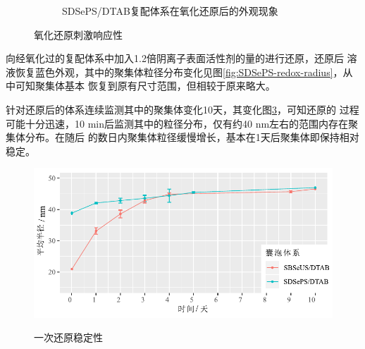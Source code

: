 \documentclass[bachelor,winfonts,replaceperiod]{jnuthesis}
\begin{document}
\begin{figure}[htbp]
\begin{subfigure}[]{.5\textwidth}
            \caption{SDSePS/DTAB复配体系在氧化还原后的外观现象}\label{fig:scheme-SDSePS-redox}
        \end{subfigure}%
        \caption{氧化还原刺激响应性}
        \label{fig:氧化还原刺激响应性}
    \end{figure}
    
    向经氧化过的复配体系中加入1.2倍阴离子表面活性剂的量的进行还原，还原后
    溶液恢复蓝色外观，其中的聚集体粒径分布变化见图\ref{fig:SDSePS-redox-radius}，从中可知聚集体基本
    恢复到原有尺寸范围，但相较于原来略大。
    
    针对还原后的体系连续监测其中的聚集体变化10天，其变化图\ref{fig:vesicle-Re-stability}，可知还原的
    过程可能十分迅速，10 min后监测其中的粒径分布，仅有约40 nm左右的范围内存在聚集体分布。在随后
    的数日内聚集体粒径缓慢增长，基本在1天后聚集体即保持相对稳定。
    
    \begin{figure}[htbp]
        \centering
        \includegraphics[width=.76\textwidth]{figure/vesicle-Re-stability.pdf}\\
        \caption{一次还原稳定性}\label{fig:vesicle-Re-stability}
    \end{figure}
    
\end{document}
